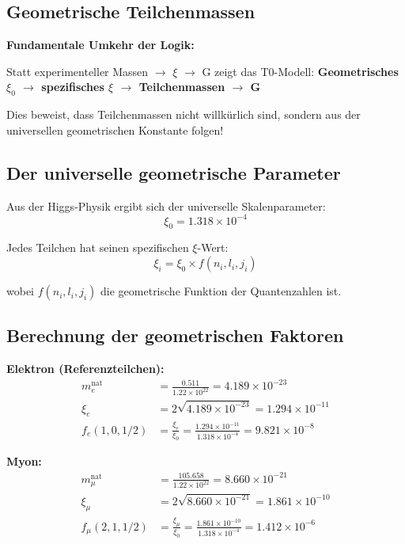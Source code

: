\documentclass[12pt,a4paper]{article}
\theoremstyle{definition}
\begin{document}
	\subsection{Geometrische Teilchenmassen}
	
	\begin{tcolorbox}[colback=red!5!white,colframe=red!75!black,title=Paradigmenwechsel]
		\textbf{Fundamentale Umkehr der Logik:}
		
		Statt experimenteller Massen $\rightarrow$ $\xi$ $\rightarrow$ G zeigt das T0-Modell:
		\textbf{Geometrisches $\xi_0$ $\rightarrow$ spezifisches $\xi$ $\rightarrow$ Teilchenmassen $\rightarrow$ G}
		
		Dies beweist, dass Teilchenmassen nicht willkürlich sind, sondern aus der universellen geometrischen Konstante folgen!
	\end{tcolorbox}
	
	\subsection{Der universelle geometrische Parameter}
	
	Aus der Higgs-Physik ergibt sich der universelle Skalenparameter:
	\begin{equation}
		\xi_0 = 1.318 \times 10^{-4}
	\end{equation}
	
	Jedes Teilchen hat seinen spezifischen $\xi$-Wert:
	\begin{equation}
		\xi_i = \xi_0 \times f(n_i, l_i, j_i)
	\end{equation}
	
	wobei $f(n_i, l_i, j_i)$ die geometrische Funktion der Quantenzahlen ist.
	
	\subsection{Berechnung der geometrischen Faktoren}
	
	\textbf{Elektron (Referenzteilchen):}
	\begin{align}
		m_e^{\text{nat}} &= \frac{0.511}{1.22 \times 10^{22}} = 4.189 \times 10^{-23}\\
		\xi_e &= 2\sqrt{4.189 \times 10^{-23}} = 1.294 \times 10^{-11}\\
		f_e(1,0,1/2) &= \frac{\xi_e}{\xi_0} = \frac{1.294 \times 10^{-11}}{1.318 \times 10^{-4}} = 9.821 \times 10^{-8}
	\end{align}
	
	\textbf{Myon:}
	\begin{align}
		m_\mu^{\text{nat}} &= \frac{105.658}{1.22 \times 10^{22}} = 8.660 \times 10^{-21}\\
		\xi_\mu &= 2\sqrt{8.660 \times 10^{-21}} = 1.861 \times 10^{-10}\\
		f_\mu(2,1,1/2) &= \frac{\xi_\mu}{\xi_0} = \frac{1.861 \times 10^{-10}}{1.318 \times 10^{-4}} = 1.412 \times 10^{-6}
	\end{align}
	
\end{document}
